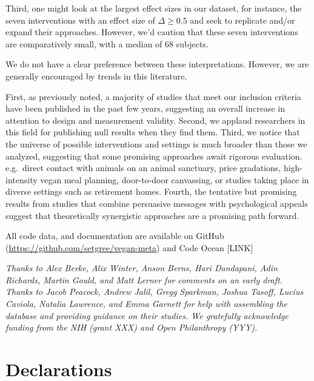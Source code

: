 \documentclass[sn-nature,referee,pdflatex]{sn-jnl}
\begin{document}
Third, one might look at the largest effect sizes in our dataset, for
instance, the seven interventions with an effect size of
\(\Delta \geq 0.5\)
\citep{bianchi2022, carfora2023, kanchanachitra2020, merrill2009, piester2020}
and seek to replicate and/or expand their approaches. However, we'd
caution that these seven interventions are comparatively small, with a
median of 68 subjects.

We do not have a clear preference between these interpretations.
However, we are generally encouraged by trends in this literature.

First, as previously noted, a majority of studies that meet our
inclusion criteria have been published in the past few years, suggesting
an overall increase in attention to design and measurement validity.
Second, we applaud researchers in this field for publishing null results
when they find them. Third, we notice that the universe of possible
interventions and settings is much broader than those we analyzed,
suggesting that some promising approaches await rigorous evaluation.
e.g.~direct contact with animals on an animal sanctuary, price
gradations, high-intensity vegan meal planning, door-to-door canvassing,
or studies taking place in diverse settings such as retirement homes.
Fourth, the tentative but promising results from studies that combine
persuasive messages with psychological appeals suggest that
theoretically synergistic approaches are a promising path forward.

\backmatter


All code data, and documentation are available on GitHub
(\url{https://github.com/setgree/vegan-meta}) and Code Ocean {[}LINK{]}


\emph{Thanks to Alex Berke, Alix Winter, Anson Berns, Hari Dandapani,
Adin Richards, Martin Gould, and Matt Lerner for comments on an early
draft. Thanks to Jacob Peacock, Andrew Jalil, Gregg Sparkman, Joshua
Tasoff, Lucius Caviola, Natalia Lawrence, and Emma Garnett for help with
assembling the database and providing guidance on their studies. We
gratefully acknowledge funding from the NIH (grant XXX) and Open
Philanthropy (YYY).}

\section*{Declarations}\label{declarations}
\end{document}
